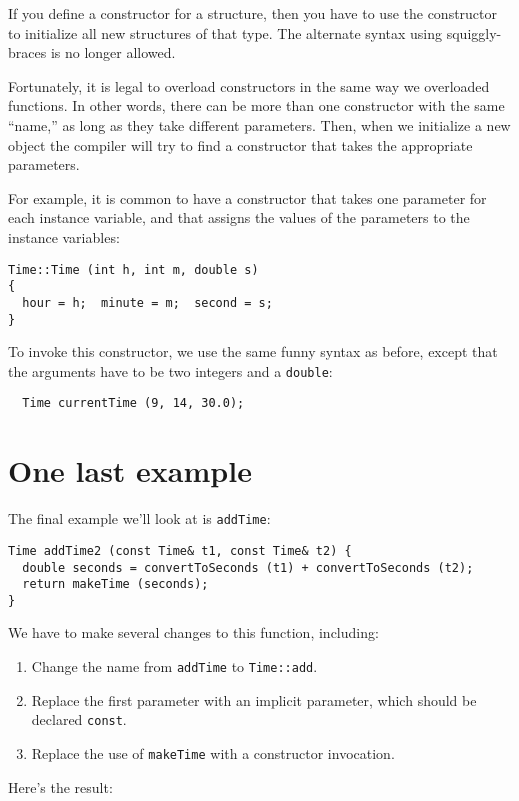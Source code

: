 If you define a constructor for a structure, then you have to
use the constructor to initialize all new structures of that
type.  The alternate syntax using squiggly-braces is no longer
allowed.

Fortunately, it is legal to overload constructors in the same
way we overloaded functions.  In other words, there can be more
than one constructor with the same ``name,'' as long as they
take different parameters.  Then, when we initialize a new object
the compiler will try to find a constructor that takes the
appropriate parameters.

For example, it is common to have a constructor that takes
one parameter for each instance variable, and that assigns
the values of the parameters to the instance variables:

\begin{verbatim}
Time::Time (int h, int m, double s)
{
  hour = h;  minute = m;  second = s;
}
\end{verbatim}
%
To invoke this constructor, we use the same funny syntax
as before, except that the arguments have to be two integers
and a {\tt double}:

\begin{verbatim}
  Time currentTime (9, 14, 30.0);
\end{verbatim}

\section {One last example}

The final example we'll look at is {\tt addTime}:

\begin{verbatim}
Time addTime2 (const Time& t1, const Time& t2) {
  double seconds = convertToSeconds (t1) + convertToSeconds (t2);
  return makeTime (seconds);
}
\end{verbatim}
%
We have to make several changes to this function, including:

\begin{enumerate}

\item Change the name from {\tt addTime} to {\tt Time::add}.

\item Replace the first parameter with an implicit parameter,
which should be declared {\tt const}.

\item Replace the use of {\tt makeTime} with a constructor
invocation.

\end{enumerate}
%
Here's the result:

